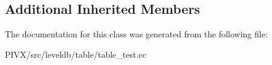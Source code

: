 \subsection*{Additional Inherited Members}


The documentation for this class was generated from the following file\+:\begin{DoxyCompactItemize}
\item 
P\+I\+V\+X/src/leveldb/table/table\+\_\+test.\+cc\end{DoxyCompactItemize}

